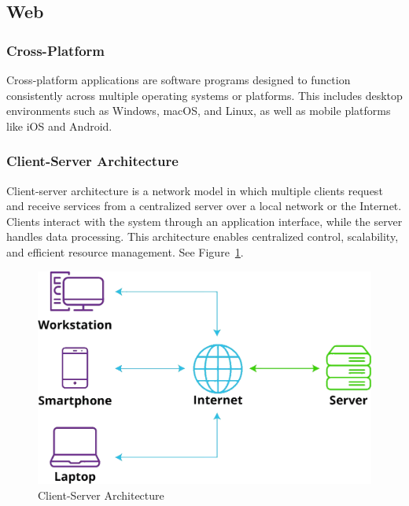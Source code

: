 \subsection{Web}
\label{subsec:web}

\subsubsection*{Cross-Platform}
\label{subsubsec:corss-platform}

Cross-platform applications are software programs designed to function consistently across multiple operating systems or platforms. This includes desktop environments such as Windows, macOS, and Linux, as well as mobile platforms like iOS and Android. \cite{sevenpeaks:cross-platform}

\subsubsection*{Client-Server Architecture}
\label{subsubsec:client-server}

Client-server architecture is a network model in which multiple clients request and receive services from a centralized server over a local network or the Internet. Clients interact with the system through an application interface, while the server handles data processing. This architecture enables centralized control, scalability, and efficient resource management. See Figure~\ref{fig:client-server-architecture}. \cite{liquidweb:client-server}


\begin{figure}[h!]
    \centering
    \includegraphics[width=0.75\linewidth]{figures/theory/client-server-architecture.png}
    \caption[Client-Server Architecture]{Client-Server Architecture \cite{liquidweb:client-server}}
    \label{fig:client-server-architecture}
\end{figure}

